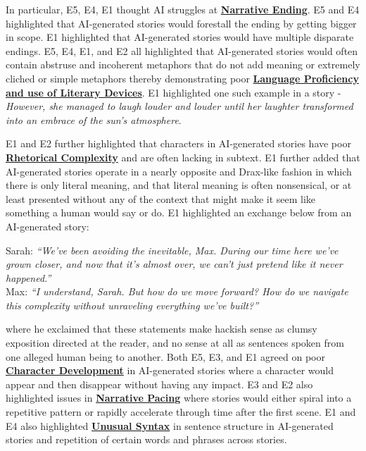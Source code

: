 In particular, E5, E4, E1 thought AI struggles at \textbf{\color{blue}\underline{Narrative Ending}}. E5 and E4 highlighted that AI-generated stories would forestall the ending by getting bigger in scope. E1 highlighted that AI-generated stories would have multiple disparate endings. E5, E4, E1, and E2 all highlighted that AI-generated stories would often contain abstruse and incoherent metaphors that do not add meaning or extremely cliched or simple metaphors thereby demonstrating poor \textbf{\color{ForestGreen}\underline{Language Proficiency and use of Literary Devices}}. E1 highlighted one such example in a story - \textit{However, she managed to laugh louder and louder until her laughter transformed into an embrace of the sun's atmosphere}.

E1 and E2 further highlighted that characters in AI-generated stories have poor \textbf{\color{red}\underline{Rhetorical Complexity}} and are often lacking in subtext. E1 further added that AI-generated stories operate in a nearly opposite and Drax-like fashion in which there is only literal meaning, and that literal meaning is often nonsensical, or at least presented without any of the context that might make it seem like something a human would say or do.
E1 highlighted an exchange below from an AI-generated story:

\begin{center}
    Sarah: \textit{``We've been avoiding the inevitable, Max. During our time here we've grown closer, and now that it's almost over, we can't just pretend like it never happened.''} \\
    Max:  \textit{``I understand, Sarah. But how do we move forward? How do we navigate this complexity without unraveling everything we've built?''}
\end{center}

where he exclaimed that these statements make hackish sense as clumsy exposition directed at the reader, and no sense at all as sentences spoken from one alleged human being to another.
Both E5, E3, and E1 agreed on poor \textbf{\color{orange}\underline{Character Development}} in AI-generated stories where a character would appear and then disappear without having any impact. E3 and E2 also highlighted issues in \textbf{\color{brown}\underline{Narrative Pacing}} where stories would either spiral into a repetitive pattern or rapidly accelerate through time after the first scene. E1 and E4 also highlighted \textbf{\color{purple}\underline{Unusual Syntax}} in sentence structure in AI-generated stories and repetition of certain words and phrases across stories.
